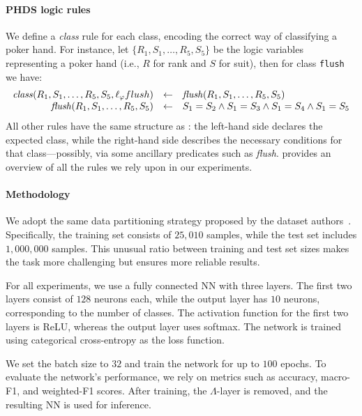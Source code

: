 \paragraph{\Gls{PHDS} logic rules}\label{par:phds-logic-rules}
%

%
We define a \emph{class} rule for each class, encoding the correct way of classifying a poker hand.
%
For instance, let $\{R_{1}, S_{1}, \dots, R_{5}, S_{5}\}$ be the logic variables representing a poker hand (i.e., $R$ for rank and $S$ for suit), then for class \texttt{flush} we have:
%
\begin{equation}\label{eq:flush-class}
     \begin{array}{rcl}
        \mathit{class}(R_1, S_1, \ldots, R_5, S_5, \ell_{\varphi}{flush}) & \leftarrow & \mathit{flush}(R_1, S_1, \ldots, R_5, S_5)
        \\
        \mathit{flush}(R_1, S_1, \ldots, R_5, S_5) & \leftarrow & S_1 = S_2 \wedge S_1 = S_3 \wedge S_1 = S_4 \wedge S_1 = S_5
    \end{array}
\end{equation}
%
All other rules have the same structure as : the left-hand side declares the expected class, while the right-hand side describes the necessary conditions for that class—possibly, via some ancillary predicates such as \emph{flush}.
%
 provides an overview of all the rules we rely upon in our experiments.


\paragraph{Methodology}\label{par:phds-methodology}
%
We adopt the same data partitioning strategy proposed by the dataset authors~\cite{poker_hand_158}.
%
Specifically, the training set consists of $25,010$ samples, while the test set includes $1,000,000$ samples.
%
This unusual ratio between training and test set sizes makes the task more challenging but ensures more reliable results.

For all experiments, we use a fully connected \gls{NN} with three layers.
%
The first two layers consist of $128$ neurons each, while the output layer has $10$ neurons, corresponding to the number of classes.
%
The activation function for the first two layers is \gls{ReLU}, whereas the output layer uses softmax.
%
The network is trained using categorical cross-entropy as the loss function.

We set the batch size to $32$ and train the network for up to $100$ epochs.
%
To evaluate the network's performance, we rely on metrics such as accuracy, macro-F1, and weighted-F1 scores.
%
After training, the \(\Lambda\)-layer is removed, and the resulting \gls{NN} is used for inference.

